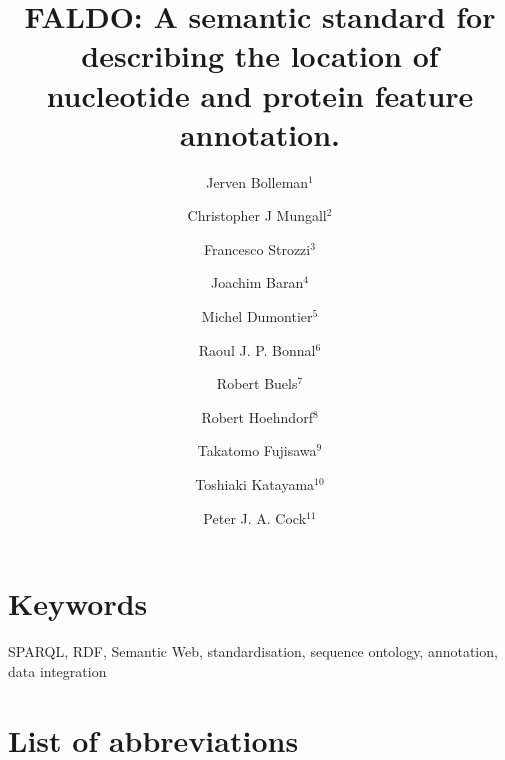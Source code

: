 \documentclass[10pt]{bmc_article}
\newenvironment{bmcformat}{\begin{raggedright}\baselineskip20pt\sloppy\setboolean{publ}{false}}{\end{raggedright}\baselineskip20pt\sloppy}
\begin{document}
\begin{bmcformat}
\title{FALDO: A semantic standard for describing the location of nucleotide and protein feature annotation.}
\author{Jerven Bolleman\correspondingauthor$^{1}$%
    \and Christopher J Mungall$^{2}$%
    \and Francesco Strozzi$^{3}$%
    \and Joachim Baran$^{4}$%
    \and Michel Dumontier$^{5}$%
    \and Raoul J. P. Bonnal$^{6}$%
    \and Robert Buels$^{7}$%
    \and Robert Hoehndorf$^{8}$%
    \and Takatomo Fujisawa$^{9}$%
    \and Toshiaki Katayama$^{10}$%
    \and Peter J. A. Cock$^{11}$%
%
}
\address{
 \iid(1) SIB Swiss Institute of Bioinformatics, Centre Medical Universitaire, 1 rue Michel
Servet, 1211 Geneva 4, Switzerland,
 \iid(2) Genomics Division, Lawrence Berkeley National Laboratory, Berkeley, CA, 94720, US,
 \iid(3) CeRSA, Parco Tecnologico Padano, Lodi 26900, Italy,
 \iid(4) Ontario Institute for Cancer Research, 101 College Street, Suite 800, Toronto, Ontario, M5G 0A3, Canada,
 \iid(5) Stanford Center for Biomedical Informatics Research, 1265 Welch Road, Room X223, Stanford, CA, 94305-5479, US,
 \iid(6) Integrative Biology Program, Istituto Nazionale Genetica Molecolare, Milan, Italy,
 \iid(7) University of California, Berkeley, Berkeley, CA, USA,
 \iid(8) Department of Computer Science, Aberystwyth, SY23 3DB, UK,
 \iid(9) Center for Information Biology, National Institute of Genetics, Research Organization of Information and Systems, 1111 Yata, Mishima, Shizuoka 411-08540, Japan,
 \iid(10) Database Center for Life Science, Research Organization of Information and Systems, 2-11-16, Yayoi, Bunkyo-ku, Tokyo, 113-0032, Japan, and
 \iid(11) The James Hutton Institute, Dundee, DD2 5DA, UK.
}
\maketitle


\section*{Keywords}
SPARQL, RDF, Semantic Web, standardisation, sequence ontology, annotation, data integration









\section*{List of abbreviations}


\end{bmcformat}
\end{document}
